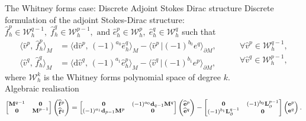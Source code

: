 \documentclass[aspectratio=169]{beamer}
\renewcommand\d{\ensuremath{\mathrm{d}}}
\newcommand*{\dual}[1]{\ensuremath{\widehat{#1}}}
\newcommand{\inpr}[3][]{\ensuremath{\langle #2, \, #3 \rangle_{#1}}}
\newcommand{\dualpr}[3][]{\ensuremath{\langle #2 \, \vert #3 \rangle_{#1}}}
\begin{document}
\begin{frame}{The Whitney forms case: Discrete Adjoint Stokes Dirac structure}
	Discrete formulation of the adjoint Stokes-Dirac structure:\\
	$\dual{f}_h^p \in \mathcal{W}_h^{q-1}, \; \dual{f}_h^q \in \mathcal{W}_h^{p-1}, \text{ and } \dual{e}_h^p \in \mathcal{W}_h^{p},  \; \dual{e}_h^q \in \mathcal{W}_h^{q}$ such that
	\begin{equation*}
		\begin{aligned}
			\inpr[M]{\dual{v}^p}{\dual{f}^p_h} &= \inpr[M]{\d\dual{v}^p}{(-1)^{a_0} \dual{e}^q_h} - \dualpr[\partial M]{\dual{v}^p}{(-1)^{b_0} e^q}, \\
			\inpr[M]{\dual{v}^q}{\dual{f}^q_h} &= \inpr[M]{\d\dual{v}^q}{(-1)^{a_1} \dual{e}^p_h} - \dualpr[\partial M]{\dual{v}^q}{(-1)^{b_1} e^p},
		\end{aligned} \qquad 
		\begin{aligned}
			\forall \dual{v}^p \in \mathcal{W}_h^{q-1}, \\
			\forall \dual{v}^q \in \mathcal{W}_h^{p-1}, \\
		\end{aligned}
	\end{equation*}
where $\mathcal{W}_h^k$ is the Whitney forms polynomial space of degree $k$. \\
Algebraic realisation
\begin{equation*}\footnotesize
	\begin{bmatrix}
		\mathbf{M}^{q-1} & \mathbf{0} \\
		\mathbf{0} & \mathbf{M}^{p-1}
	\end{bmatrix}
	\begin{pmatrix}
		\widehat{\mathbf{f}}^p \\
		\widehat{\mathbf{f}}^q
	\end{pmatrix} =
	\begin{bmatrix}
		\mathbf{0} & (-1)^{a_0}\mathbf{d}_{q-1}\mathbf{M}^q\\
		(-1)^{a_1}\mathbf{d}_{p-1}\mathbf{M}^p & \mathbf{0}
	\end{bmatrix}
	\begin{pmatrix}
		\dual{\mathbf{e}}^p \\
		\dual{\mathbf{e}}^q
	\end{pmatrix} -
	\begin{bmatrix}
		\mathbf{0} & (-1)^{b_0}\mathbf{L}_\partial^{p-1} \\
		(-1)^{b_1}\mathbf{L}^{q-1}_\partial & \mathbf{0}
	\end{bmatrix}
	\begin{pmatrix}
		{\mathbf{e}}^p \\
		{\mathbf{e}}^q
	\end{pmatrix}.
\end{equation*}
\end{frame}
\end{document}
